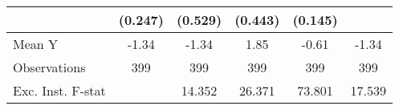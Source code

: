 {\begin{tabular}{l*{5}{c}}
            &     (0.247)         &     (0.529)         &     (0.443)         &     (0.145)         &                     \\
\midrule
Mean Y      &       -1.34         &       -1.34         &        1.85         &       -0.61         &       -1.34         \\
Observations&         399         &         399         &         399         &         399         &         399         \\
Exc. Inst. F-stat&                     &      14.352         &      26.371         &      73.801         &      17.539         \\
\bottomrule
\end{tabular}
}
